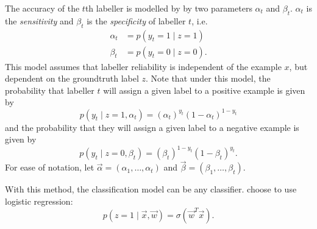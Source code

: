         The accuracy of the $t$th labeller is modelled by by two parameters
        $\alpha_t$ and $\beta_t$. $\alpha_t$ is the \emph{sensitivity} and
        $\beta_t$ is the \emph{specificity} of labeller $t$, i.e.
        \begin{align*}
            \alpha_t &= p(y_t = 1 \mid z = 1)\\
            \beta_t &= p(y_t = 0 \mid z = 0).
        \end{align*}
        This model assumes that labeller reliability is independent of the
        example $x$, but dependent on the groundtruth label $z$. Note that under
        this model, the probability that labeller $t$ will assign a given label
        to a positive example is given by
        \begin{equation*}
            p(y_t \mid z = 1, \alpha_t) =
                (\alpha_t)^{y_t} (1 - \alpha_t)^{1 - y_t}
        \end{equation*}
        and the probability that they will assign a given label to a negative
        example is given by
        \begin{equation*}
            p(y_t \mid z = 0, \beta_t) =
                (\beta_t)^{1 - y_t} (1 - \beta_t)^{y_t}.
        \end{equation*}
        For ease of notation, let $\vec \alpha = (\alpha_1, \dots, \alpha_t)$
        and $\vec \beta = (\beta_1, \dots, \beta_t)$.

        With this method, the classification model can be any classifier.
        \citeauthor{raykar10} choose to use logistic regression:
        \begin{equation}
            \label{eq:raykar-logreg}
            p(z = 1 \mid \vec x, \vec w) = \sigma(\vec w^T \vec x).
        \end{equation}

